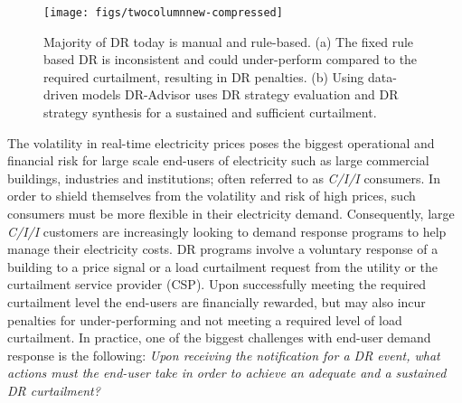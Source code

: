 \documentclass{sig-alternate-ipsn13}
\theoremstyle{definition}
\begin{document}
\begin{figure}
\centering
\texttt{[image: figs/twocolumnnew-compressed]}
\caption{Majority of DR today is manual and rule-based. (a) The fixed rule based DR is inconsistent and could under-perform compared to the required curtailment, resulting in DR penalties. (b) Using data-driven models DR-Advisor uses DR strategy evaluation and DR strategy synthesis for a sustained and sufficient curtailment.}
\label{fig:twocolumn}
\vspace{-10pt}
\end{figure}

The volatility in real-time electricity prices poses the biggest operational and financial risk for large scale end-users of electricity such as large commercial buildings, industries and institutions; often referred to as \textit{C/I/I} consumers. 
In order to shield themselves from the volatility and risk of high prices, such consumers must be more flexible in their electricity demand. 
Consequently, large \textit{C/I/I} customers are increasingly looking to demand response programs to help manage their electricity costs.
DR programs involve a voluntary response of a building to a price signal or a load curtailment request from the utility or the curtailment service provider (CSP). 
Upon successfully meeting the required curtailment level the end-users are financially rewarded, but may also incur penalties for under-performing and not meeting a required level of load curtailment.
In practice, one of the biggest challenges with end-user demand response is the following: \emph{Upon receiving the notification for a DR event, what actions must the end-user take in order to achieve an adequate and a sustained DR curtailment?} 
\end{document}
